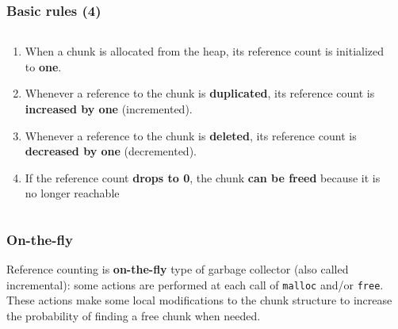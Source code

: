 \documentclass[presentation]{beamer}
\begin{document}
\begin{frame}
  \frametitle{Basic rules (4)}
  \begin{columns}
    \begin{column}{0.5\textwidth}
      \begin{enumerate}
        \color{gray} \item When a chunk is allocated from the heap, its reference count is initialized to \textbf{one}. 
        \color{gray} \item Whenever a reference to the chunk is \textbf{duplicated}, its reference count is \textbf{increased by one} (incremented).
        \color{gray} \item Whenever a reference to the chunk is \textbf{deleted}, its reference count is \textbf{decreased by one} (decremented).
        \color{black} \item If the reference count \textbf{drops to 0}, the chunk \textbf{can be freed} because it is no longer reachable
      \end{enumerate}
    \end{column}
    \begin{column}{0.5\textwidth} 
    \end{column}
  \end{columns}
\end{frame}

\begin{frame}
  \frametitle{On-the-fly} 
  \justifying
Reference counting is \textbf{on-the-fly} type of garbage collector (also called incremental): some actions are performed at each call of \texttt{malloc} and/or \texttt{free}. These actions make some local modifications to the chunk structure to increase the probability of finding a free chunk
when needed.
\end{frame}
\end{document}
